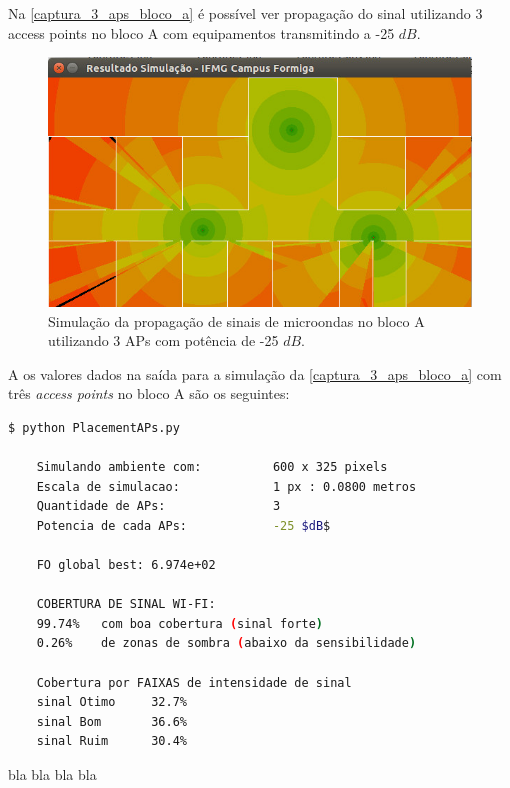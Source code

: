 \documentclass[
	12pt,				%
	twoside,			%
	a4paper,			%
	english,			%
	french,				%
	spanish,			%
	brazil				%
	]{abntex2}
\begin{document}
Na \autoref{captura_3_aps_bloco_a} é possível ver propagação do sinal
utilizando 3 access points no bloco A com equipamentos transmitindo a
-25 \(dB\).

\begin{figure}[ht]
    \caption{\label{captura_3_aps_bloco_a} Simulação da propagação de sinais de microondas no bloco A utilizando 3 APs com potência de -25 $dB$.
    }
    \begin{center}
        \includegraphics[scale=0.7]{imagens/captura-3-aps-bloco-a.jpg}
    \end{center}
\end{figure}

A os valores dados na saída para a simulação da
\autoref{captura_3_aps_bloco_a} com três \emph{access points} no bloco A
são os seguintes:

\begin{lstlisting}[language=bash]
    $ python PlacementAPs.py 
    
    Simulando ambiente com:          600 x 325 pixels
    Escala de simulacao:             1 px : 0.0800 metros
    Quantidade de APs:               3
    Potencia de cada APs:            -25 $dB$
    
    FO global best: 6.974e+02
    
    COBERTURA DE SINAL WI-FI:
    99.74%   com boa cobertura (sinal forte)
    0.26%    de zonas de sombra (abaixo da sensibilidade)
    
    Cobertura por FAIXAS de intensidade de sinal
    sinal Otimo     32.7%
    sinal Bom       36.6%
    sinal Ruim      30.4%
\end{lstlisting}

bla bla bla bla
\end{document}
